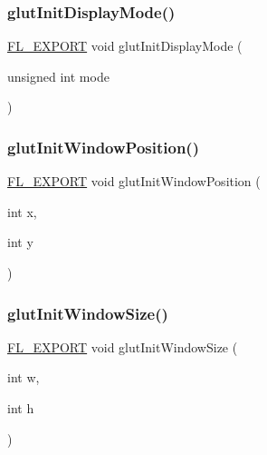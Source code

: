 \mbox{\label{glut_8_h_a1da7b5179fa1ba1f94d389b1b2fd672e}} 
\subsubsection{\texorpdfstring{glut\+Init\+Display\+Mode()}{glutInitDisplayMode()}}
{\footnotesize\ttfamily \hyperlink{_fl___export_8_h_aa9ba29a18aee9d738370a06eeb4470fc}{F\+L\+\_\+\+E\+X\+P\+O\+RT} void glut\+Init\+Display\+Mode (\begin{DoxyParamCaption}\item[{unsigned int}]{mode }\end{DoxyParamCaption})}

\mbox{\label{glut_8_h_a00c38ea4cac5586ef20f10160fcc4653}} 
\subsubsection{\texorpdfstring{glut\+Init\+Window\+Position()}{glutInitWindowPosition()}}
{\footnotesize\ttfamily \hyperlink{_fl___export_8_h_aa9ba29a18aee9d738370a06eeb4470fc}{F\+L\+\_\+\+E\+X\+P\+O\+RT} void glut\+Init\+Window\+Position (\begin{DoxyParamCaption}\item[{int}]{x,  }\item[{int}]{y }\end{DoxyParamCaption})}

\mbox{\label{glut_8_h_a70c4c9eb10c0cce21d990b8966844724}} 
\subsubsection{\texorpdfstring{glut\+Init\+Window\+Size()}{glutInitWindowSize()}}
{\footnotesize\ttfamily \hyperlink{_fl___export_8_h_aa9ba29a18aee9d738370a06eeb4470fc}{F\+L\+\_\+\+E\+X\+P\+O\+RT} void glut\+Init\+Window\+Size (\begin{DoxyParamCaption}\item[{int}]{w,  }\item[{int}]{h }\end{DoxyParamCaption})}

